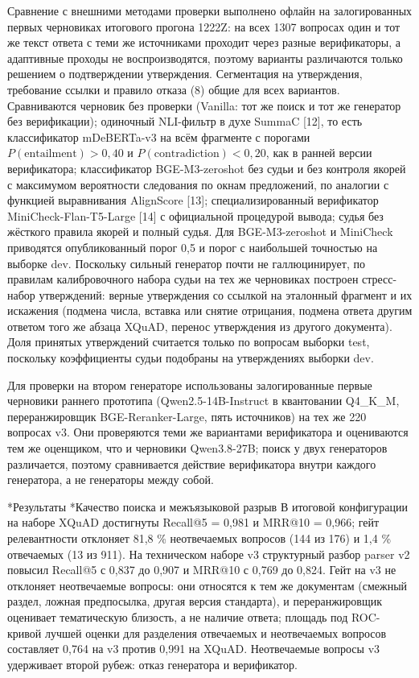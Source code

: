 \documentclass[14pt,a4paper]{extarticle}
\makeatletter
\renewcommand\section{\@startsection{section}{1}{\z@}{12pt plus 2pt}{6pt}{\normalfont\normalsize\bfseries\raggedright}}
\renewcommand\subsection{\@startsection{subsection}{2}{\z@}{8pt plus 2pt}{4pt}{\normalfont\normalsize\bfseries\itshape\raggedright}}
\makeatother
\begin{document}
Сравнение с внешними методами проверки выполнено офлайн на залогированных первых черновиках итогового прогона 1222Z: на всех 1307 вопросах один и тот же текст ответа с теми же источниками проходит через разные верификаторы, а адаптивные проходы не воспроизводятся, поэтому варианты различаются только решением о подтверждении утверждения. Сегментация на утверждения, требование ссылки и правило отказа (8) общие для всех вариантов. Сравниваются черновик без проверки (Vanilla: тот же поиск и тот же генератор без верификации); одиночный NLI-фильтр в духе SummaC [12], то есть классификатор mDeBERTa-v3 на всём фрагменте с порогами $P(\text{entailment}) > 0{,}40$ и $P(\text{contradiction}) < 0{,}20$, как в ранней версии верификатора; классификатор BGE-M3-zeroshot без судьи и без контроля якорей с максимумом вероятности следования по окнам предложений, по аналогии с функцией выравнивания AlignScore [13]; специализированный верификатор MiniCheck-Flan-T5-Large [14] с официальной процедурой вывода; судья без жёсткого правила якорей и полный судья. Для BGE-M3-zeroshot и MiniCheck приводятся опубликованный порог 0,5 и порог с наибольшей точностью на выборке dev. Поскольку сильный генератор почти не галлюцинирует, по правилам калибровочного набора судьи на тех же черновиках построен стресс-набор утверждений: верные утверждения со ссылкой на эталонный фрагмент и их искажения (подмена числа, вставка или снятие отрицания, подмена ответа другим ответом того же абзаца XQuAD, перенос утверждения из другого документа). Доля принятых утверждений считается только по вопросам выборки test, поскольку коэффициенты судьи подобраны на утверждениях выборки dev.

Для проверки на втором генераторе использованы залогированные первые черновики раннего прототипа (Qwen2.5-14B-Instruct в квантовании Q4\_K\_M, переранжировщик BGE-Reranker-Large, пять источников) на тех же 220 вопросах v3. Они проверяются теми же вариантами верификатора и оцениваются тем же оценщиком, что и черновики Qwen3.8-27B; поиск у двух генераторов различается, поэтому сравнивается действие верификатора внутри каждого генератора, а не генераторы между собой.

\section*{Результаты}
\subsection*{Качество поиска и межъязыковой разрыв}
В итоговой конфигурации на наборе XQuAD достигнуты Recall@5 = 0,981 и MRR@10 = 0,966; гейт релевантности отклоняет 81,8 \% неотвечаемых вопросов (144 из 176) и 1,4 \% отвечаемых (13 из 911). На техническом наборе v3 структурный разбор parser v2 повысил Recall@5 с 0,837 до 0,907 и MRR@10 с 0,769 до 0,824. Гейт на v3 не отклоняет неотвечаемые вопросы: они относятся к тем же документам (смежный раздел, ложная предпосылка, другая версия стандарта), и переранжировщик оценивает тематическую близость, а не наличие ответа; площадь под ROC-кривой лучшей оценки для разделения отвечаемых и неотвечаемых вопросов составляет 0,764 на v3 против 0,991 на XQuAD. Неотвечаемые вопросы v3 удерживает второй рубеж: отказ генератора и верификатор.
\end{document}
